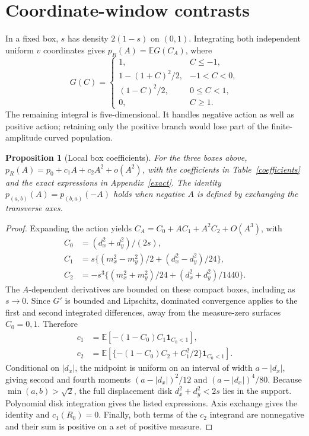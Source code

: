 \documentclass[11pt,a4paper]{article}
\newcommand{\E}{\mathbb E}
\newcommand{\ind}{\mathbf 1}
\newtheorem{proposition}{Proposition}
\begin{document}
\section{Coordinate-window contrasts}
In a fixed box, $s$ has density $2(1-s)$ on $(0,1)$. Integrating both independent
uniform $v$ coordinates gives $p_R(A)=\E G(C_A)$, where
\begin{equation}
G(C)=\begin{cases}
1,&C\leq-1,\\
1-(1+C)^2/2,&-1<C<0,\\
(1-C)^2/2,&0\leq C<1,\\
0,&C\geq1.
\end{cases} \label{survival}
\end{equation}
The remaining integral is five-dimensional. It handles negative action as
well as positive action; retaining only the positive branch would lose part
of the finite-amplitude curved population.

\begin{proposition}[Local box coefficients]
For the three boxes above,
$p_R(A)=p_0+c_1A+c_2A^2+o(A^2)$, with the coefficients in
Table~\ref{coefficients} and the exact expressions in Appendix~\ref{exact}.
The identity $p_{(a,b)}(A)=p_{(b,a)}(-A)$ holds when negative $A$ is defined
by exchanging the transverse axes.
\end{proposition}
\begin{proof}
Expanding the action yields $C_A=C_0+AC_1+A^2C_2+O(A^3)$, with
\begin{align}
 C_0&=(d_x^2+d_y^2)/(2s),\nonumber\\
 C_1&=s\{(m_x^2-m_y^2)/2+(d_x^2-d_y^2)/24\},\nonumber\\
 C_2&=-s^3\{(m_x^2+m_y^2)/24+(d_x^2+d_y^2)/1440\}. \label{expansion}
\end{align}
The $A$-dependent derivatives are bounded on these compact boxes, including
as $s\to0$. Since $G'$ is bounded and Lipschitz, dominated convergence applies
to the first and second integrated differences, away from the measure-zero
surfaces $C_0=0,1$. Therefore
\begin{align}
 c_1&=\E[-(1-C_0)C_1\ind_{C_0<1}],\nonumber\\
 c_2&=\E[\{-(1-C_0)C_2+C_1^2/2\}\ind_{C_0<1}]. \label{coeffintegrals}
\end{align}
Conditional on $|d_x|$, the midpoint is uniform on an interval of width
$a-|d_x|$, giving second and fourth moments $(a-|d_x|)^2/12$ and
$(a-|d_x|)^4/80$. Because $\min(a,b)>\sqrt2$, the full displacement disk
$d_x^2+d_y^2<2s$ lies in the support. Polynomial disk integration gives the
listed expressions. Axis exchange gives the identity and $c_1(R_0)=0$.
Finally, both terms of the $c_2$ integrand are nonnegative and their sum is
positive on a set of positive measure.
\end{proof}
\end{document}
